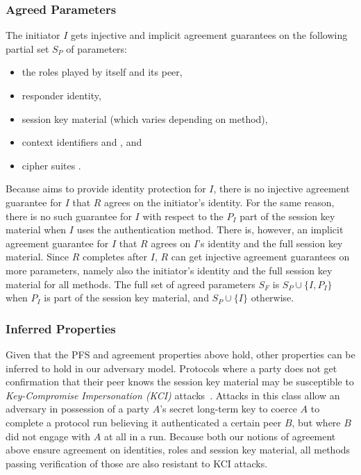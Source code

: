 \subsubsection{Agreed Parameters}
\label{sec:agreedParams}
The initiator $I$ gets injective and implicit agreement guarantees on the
following partial set $S_P$ of parameters:
\begin{itemize}
    \item the roles played by itself and its peer,
    \item responder identity,
    \item session key material (which varies depending on \mEdhoc{} method),
    \item context identifiers \mCi{} and \mCr{}, and
    \item cipher suites \mSuites{}.
\end{itemize}
%
Because \mEdhoc{} aims to provide identity protection for $I$, there is no
injective agreement guarantee for $I$ that $R$ agrees on the initiator's
identity.
%
For the same reason, there is no such guarantee for $I$ with respect to
the $P_I$ part of the session key material when $I$ uses the \mStat{}
authentication method.
%
There is, however, an implicit agreement guarantee for $I$ that $R$ agrees on
$I$'s identity and the full session key material.
%
Since $R$ completes after $I$, $R$ can get injective agreement guarantees on
more parameters, namely also the initiator's identity and the full session key
material for all methods.
%
The full set of agreed parameters $S_F$ is $S_P \cup \{I, P_I\}$
when $P_I$ is
part of the session key material, and $S_P \cup \{I\}$ otherwise.
%

\subsubsection{Inferred Properties}
Given that the PFS and agreement properties
above hold, other properties can be inferred to hold in our adversary model.
%
Protocols where a party does not get confirmation that their peer knows the
session key material may be susceptible to
\emph{Key-Compromise Impersonation (KCI)}
attacks~\cite{DBLP:conf/ima/Blake-WilsonJM97}.
%
Attacks in this class allow an adversary in possession of a party $A$'s secret
long-term key to coerce $A$ to complete a
protocol run believing it authenticated a certain peer $B$, but where $B$ did
not engage with $A$ at all in a run.
%
Because both our notions of agreement above ensure agreement on identities,
roles and session key material, all methods passing verification of those are
also resistant to KCI attacks.
%

